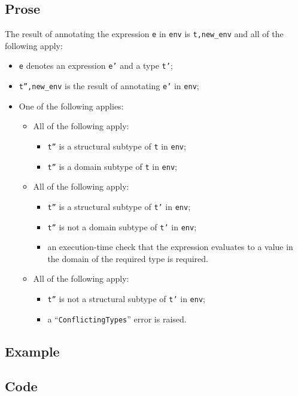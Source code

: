 \documentclass{book}
\begin{document}
  \subsection{Prose}
  The result of annotating the expression \texttt{e} in \texttt{env} is
\texttt{t,new\_env} and all of the following apply:
  \begin{itemize}
  \item \texttt{e} denotes an expression \texttt{e'} and a type \texttt{t'};
  \item \texttt{t'',new\_env} is the result of annotating \texttt{e'} in \texttt{env};
  \item One of the following applies:
    \begin{itemize}
    \item All of the following apply:
      \begin{itemize}
      \item \texttt{t''} is a structural subtype of \texttt{t} in \texttt{env};
      \item \texttt{t''} is a domain subtype of \texttt{t} in \texttt{env};
      \end{itemize}
    \item All of the following apply:
      \begin{itemize}
      \item \texttt{t''} is a structural subtype of \texttt{t'} in \texttt{env};
      \item \texttt{t''} is not a domain subtype of \texttt{t'} in \texttt{env};
      \item an execution-time check that the expression evaluates to a value in the
        domain of the required type is required.
      \end{itemize}
   \item All of the following apply:
     \begin{itemize}
     \item \texttt{t''} is not a structural subtype of \texttt{t'} in \texttt{env};
     \item a ``\texttt{ConflictingTypes}'' error is raised.
     \end{itemize}
   \end{itemize}
  \end{itemize}

  \subsection{Example}

  \subsection{Code}
\end{document}
